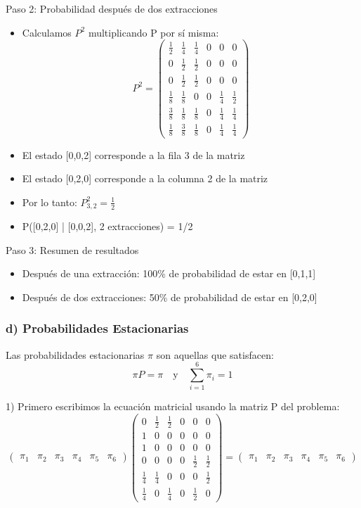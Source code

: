 \documentclass[12pt]{article}
\begin{document}
Paso 2: Probabilidad después de dos extracciones
\begin{itemize}
    \item Calculamos $P^2$ multiplicando P por sí misma:
    \[
    P^2 = \begin{pmatrix}
    \frac{1}{2} & \frac{1}{4} & \frac{1}{4} & 0 & 0 & 0 \\
    0 & \frac{1}{2} & \frac{1}{2} & 0 & 0 & 0 \\
    0 & \frac{1}{2} & \frac{1}{2} & 0 & 0 & 0 \\
    \frac{1}{8} & \frac{1}{8} & 0 & 0 & \frac{1}{4} & \frac{1}{2} \\
    \frac{3}{8} & \frac{1}{8} & \frac{1}{8} & 0 & \frac{1}{4} & \frac{1}{4} \\
    \frac{1}{8} & \frac{3}{8} & \frac{1}{8} & 0 & \frac{1}{4} & \frac{1}{4}
    \end{pmatrix}
    \]
    \item El estado [0,0,2] corresponde a la fila 3 de la matriz
    \item El estado [0,2,0] corresponde a la columna 2 de la matriz  
    \item Por lo tanto: $P^2_{3,2} = \frac{1}{2}$
    \item P([0,2,0] | [0,0,2], 2 extracciones) = 1/2
\end{itemize}

Paso 3: Resumen de resultados
\begin{itemize}
    \item Después de una extracción: 100\% de probabilidad de estar en [0,1,1]
    \item Después de dos extracciones: 50\% de probabilidad de estar en [0,2,0]
\end{itemize}

\subsubsection{d) Probabilidades Estacionarias}

Las probabilidades estacionarias $\pi$ son aquellas que satisfacen:
\[
\pi P = \pi \quad \text{y} \quad \sum_{i=1}^6 \pi_i = 1
\]

1) Primero escribimos la ecuación matricial usando la matriz P del problema:
\[
\begin{pmatrix} \pi_1 & \pi_2 & \pi_3 & \pi_4 & \pi_5 & \pi_6 \end{pmatrix} 
\begin{pmatrix}
0 & \frac{1}{2} & \frac{1}{2} & 0 & 0 & 0 \\
1 & 0 & 0 & 0 & 0 & 0 \\
1 & 0 & 0 & 0 & 0 & 0 \\
0 & 0 & 0 & 0 & \frac{1}{2} & \frac{1}{2} \\
\frac{1}{4} & \frac{1}{4} & 0 & 0 & 0 & \frac{1}{2} \\
\frac{1}{4} & 0 & \frac{1}{4} & 0 & \frac{1}{2} & 0
\end{pmatrix} = 
\begin{pmatrix} \pi_1 & \pi_2 & \pi_3 & \pi_4 & \pi_5 & \pi_6 \end{pmatrix}
\]
\end{document}
